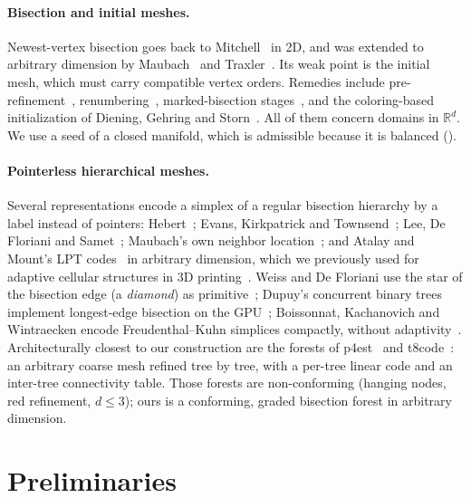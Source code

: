 \documentclass[11pt]{article}
\theoremstyle{plain}
\theoremstyle{definition}
\theoremstyle{remark}
\newcommand{\R}{\mathbb{R}}
\begin{document}
\paragraph{Bisection and initial meshes.}
Newest-vertex bisection goes back to Mitchell~\cite{mitchell1988,mitchell1991}
in 2D, and was extended to arbitrary dimension by
Maubach~\cite{maubach1995} and Traxler~\cite{traxler1997}. Its weak point
is the initial mesh, which must carry compatible vertex orders. Remedies
include pre-refinement~\cite{kossaczky1994,stevenson2008}, renumbering~\cite{agk2018},
marked-bisection stages~\cite{belda2023}, and the coloring-based
initialization of Diening, Gehring and Storn~\cite{dgs2025}. All of them
concern domains in $\R^d$. We use a seed of a closed manifold, which is
admissible because it is balanced
().

\paragraph{Pointerless hierarchical meshes.}
Several representations encode a simplex of a regular bisection hierarchy
by a label instead of pointers: Hebert~\cite{hebert1994}; Evans,
Kirkpatrick and Townsend~\cite{ekt2001}; Lee, De Floriani and
Samet~\cite{ldfs2001}; Maubach's own neighbor location~\cite{maubach1996};
and Atalay and Mount's LPT codes~\cite{atalaymount2007} in arbitrary
dimension, which we previously used for adaptive cellular structures in
3D printing~\cite{sa2015adaptive}. Weiss and De Floriani use the star of
the bisection edge (a \emph{diamond}) as primitive~\cite{weissdefloriani2011};
Dupuy's concurrent binary trees implement longest-edge bisection on the
GPU~\cite{dupuy2020}; Boissonnat, Kachanovich and Wintraecken encode
Freudenthal--Kuhn simplices compactly, without adaptivity~\cite{bkw2023}.
Architecturally closest to our construction are the forests of
p4est~\cite{p4est2011} and t8code~\cite{bursteddeholke2016}: an arbitrary
coarse mesh refined tree by tree, with a per-tree linear code and an
inter-tree connectivity table. Those forests are non-conforming (hanging
nodes, red refinement, $d\le3$); ours is a conforming, graded bisection
forest in arbitrary dimension.

\section{Preliminaries}
\label{sec:prelim}
\end{document}
